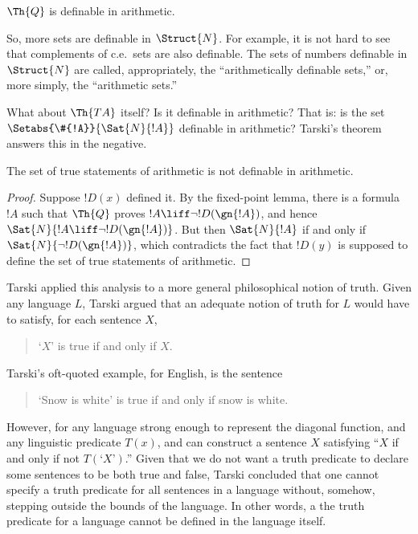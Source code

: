 \documentclass[../../include/open-logic-section]{subfiles}
\begin{document}
\begin{cor}
$\Th{Q}$ is definable in arithmetic.
\end{cor}

So, more sets are definable in $\Struct{N}$. For example, it is not hard
to see that complements of c.e.\ sets are also definable. The sets of
numbers definable in $\Struct{N}$ are called, appropriately, the
``arithmetically definable sets,'' or, more simply, the ``arithmetic
sets.'' 

What about $\Th{TA}$ itself? Is it definable in arithmetic? That
is: is the set $\Setabs{\#{!A}}{\Sat{N}{!A}}$ definable in
arithmetic? Tarski's theorem answers this in the negative.

\begin{thm}
The set of true statements of arithmetic is not definable in arithmetic.
\end{thm}

\begin{proof} 
Suppose $!D(x)$ defined it. By the fixed-point lemma, there is a
formula $!A$ such that $\Th{Q}$ proves $!A \liff \lnot !D(\gn{!A})$,
and hence $\Sat{N}{!A \liff \lnot !D(\gn{!A})}$. But then
$\Sat{N}{!A}$ if and only if $\Sat{N}{\lnot !D(\gn{!A})}$, which
contradicts the fact that $!D(y)$ is supposed to define the set of true
statements of arithmetic.  
\end{proof}

Tarski applied this analysis to a more general philosophical notion of
truth. Given any language $L$, Tarski argued that an adequate notion
of truth for $L$ would have to satisfy, for each sentence $X$,
\begin{quote}
`$X$' is true if and only if $X$.
\end{quote}
Tarski's oft-quoted example, for English, is the sentence
\begin{quote}
`Snow is white' is true if and only if snow is white.
\end{quote}
However, for any language strong enough to represent the diagonal
function, and any linguistic predicate $T(x)$, and can construct a
sentence $X$ satisfying ``$X$ if and only if not $T(\text{`$X$'})$.''
Given that we do not want a truth predicate to declare some sentences
to be both true and false, Tarski concluded that one cannot specify a
truth predicate for all sentences in a language without, somehow,
stepping outside the bounds of the language. In other words, a the
truth predicate for a language cannot be defined in the language
itself.
\end{document}
